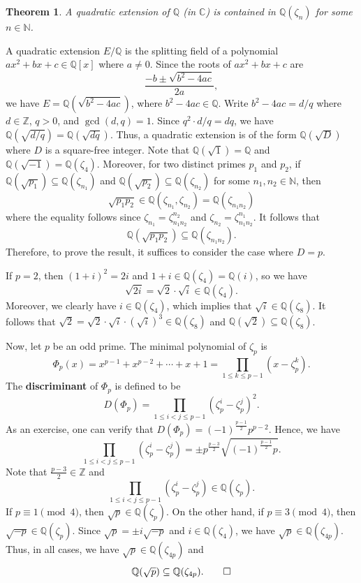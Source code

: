 \documentclass[10pt]{article}
\makeatletter
\newcommand{\C}{\mathbb{C}}
\newcommand{\N}{\mathbb{N}}
\newcommand{\Z}{\mathbb{Z}}
\newcommand{\Q}{\mathbb{Q}}
\theoremstyle{newstyle}
\newtheorem{thm}{Theorem}[section]
\newenvironment{pf}[1][\proofname]{\par
  \pushQED{\qed}%
  \normalfont \topsep0\p@\relax
  \trivlist
  \item[\hskip\labelsep\scshape
  #1\@addpunct{.}]\ignorespaces
}{%
  \popQED\endtrivlist\@endpefalse
}
\makeatother
\begin{document}
\begin{thm}
A quadratic extension of $\Q$ (in $\C$) is contained in $\Q(\zeta_n)$ for some $n \in \N$. 
\end{thm}
\begin{pf}
A quadratic extension $E/\Q$ is the splitting field of a polynomial $ax^2 + bx + c \in \Q[x]$ where 
$a \neq 0$. Since the roots of $ax^2 + bx + c$ are 
\[ \frac{-b \pm \sqrt{b^2-4ac}}{2a}, \]
we have $E = \Q(\sqrt{b^2-4ac})$, where $b^2 - 4ac \in \Q$. Write $b^2 - 4ac = d/q$ where 
$d \in \Z$, $q > 0$, and $\gcd(d, q) = 1$. Since $q^2 \cdot d/q = dq$, we have 
$\Q(\sqrt{d/q}) = \Q(\sqrt{dq})$. Thus, a quadratic extension is of the form $\Q(\sqrt D)$ where 
$D$ is a square-free integer. Note that $\Q(\sqrt1) = \Q$ and $\Q(\sqrt{-1}) = \Q(\zeta_4)$. 
Moreover, for two distinct primes $p_1$ and $p_2$, if $\Q(\sqrt{p_1}) \subseteq \Q(\zeta_{n_1})$
and $\Q(\sqrt{p_2}) \subseteq \Q(\zeta_{n_2})$ for some $n_1, n_2 \in \N$, then 
\[ \sqrt{p_1p_2} \in \Q(\zeta_{n_1}, \zeta_{n_2}) = \Q(\zeta_{n_1n_2}) \]
where the equality follows since $\zeta_{n_1} = \zeta_{n_1n_2}^{n_2}$ and 
$\zeta_{n_2} = \zeta_{n_1n_2}^{n_1}$. It follows that 
\[ \Q(\sqrt{p_1p_2}) \subseteq \Q(\zeta_{n_1n_2}). \] 
Therefore, to prove the result, it suffices to consider the case where $D = p$. 

If $p = 2$, then $(1+i)^2 = 2i$ and $1+i \in \Q(\zeta_4) = \Q(i)$, so we have 
\[ \sqrt{2i} = \sqrt2 \cdot \sqrt i \in \Q(\zeta_4). \]
Moreover, we clearly have $i \in \Q(\zeta_4)$, which implies that $\sqrt{i} \in \Q(\zeta_8)$.
It follows that 
$\sqrt2 = \sqrt2 \cdot \sqrt i \cdot (\sqrt i)^3 \in \Q(\zeta_8)$ and $\Q(\sqrt2) \subseteq \Q(\zeta_8)$. 

Now, let $p$ be an odd prime. The minimal polynomial of $\zeta_p$ is 
\[ \Phi_p(x) = x^{p-1} + x^{p-2} + \cdots + x + 1 = \prod_{1\leq k \leq p-1} (x - \zeta_p^k). \]
The {\bf discriminant} of $\Phi_p$ is defined to be 
\[ D(\Phi_p) = \prod_{1 \leq i < j \leq p-1} (\zeta_p^i - \zeta_p^j)^2. \]
As an exercise, one can verify that $D(\Phi_p) = (-1)^{\frac{p-1}2} p^{p-2}$. Hence, we have 
\[ \prod_{1\leq i < j \leq p-1} (\zeta_p^i - \zeta_p^j) = \pm p^{\frac{p-3}2} \sqrt{(-1)^{\frac{p-1}2} p}. \]
Note that $\frac{p-3}2 \in \Z$ and 
\[ \prod_{1 \leq i < j \leq p-1} (\zeta_p^i - \zeta_p^j) \in \Q(\zeta_p). \]
If $p \equiv 1 \pmod 4$, then $\sqrt p \in \Q(\zeta_p)$. On the other hand, if 
$p \equiv 3 \pmod 4$, then $\sqrt{-p} \in \Q(\zeta_p)$. Since $\sqrt p = \pm i \sqrt{-p}$ and 
$i \in \Q(\zeta_4)$, we have $\sqrt p \in \Q(\zeta_{4p})$. Thus, in all cases, we have 
$\sqrt p \in \Q(\zeta_{4p})$ and 
\[ \Q(\sqrt p) \subseteq \Q(\zeta_{4p}). \qedhere \]
\end{pf}
\end{document}
